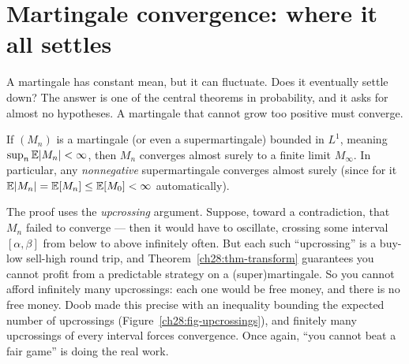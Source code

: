 \section{Martingale convergence: where it all settles}
\label{ch28:convergence}

A martingale has constant mean, but it can fluctuate. Does it eventually settle down? The answer is one
of the central theorems in probability, and it asks for almost no hypotheses. A martingale that cannot
grow too positive must converge.

\begin{theorem}
\label{ch28:thm-convergence}
If $(M_n)$ is a martingale (or even a supermartingale) bounded in $L^1$, meaning
$\sup_n \operatorname{\mathbb{E}}\lvert M_n\rvert < \infty$, then $M_n$ converges almost surely to a finite limit $M_\infty$. In
particular, any \emph{nonnegative} supermartingale converges almost surely (since for it
$\operatorname{\mathbb{E}}\lvert M_n\rvert = \operatorname{\mathbb{E}}[M_n] \le \operatorname{\mathbb{E}}[M_0] < \infty$ automatically).
\end{theorem}

\begin{intuitionbox}
The proof uses the \emph{upcrossing} argument. Suppose, toward a
contradiction, that $M_n$ failed to converge --- then it would have to oscillate, crossing some
interval $[\alpha,\beta]$ from below to above infinitely often. But each such ``upcrossing'' is a
buy-low sell-high round trip, and Theorem~\ref{ch28:thm-transform} guarantees you cannot profit from a
predictable strategy on a (super)martingale. So you cannot afford infinitely many upcrossings: each one
would be free money, and there is no free money. Doob made this precise with an inequality bounding the
expected number of upcrossings (Figure~\ref{ch28:fig-upcrossings}), and finitely many upcrossings of every interval forces convergence.
Once again, ``you cannot beat a fair game'' is doing the real work.
\end{intuitionbox}

